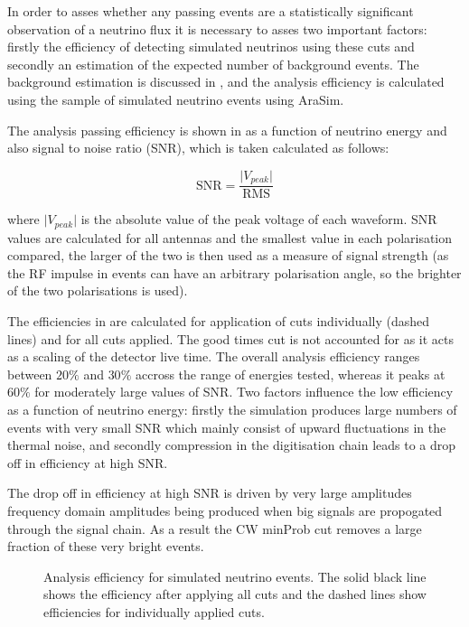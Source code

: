In order to asses whether any passing events are a statistically significant observation of a neutrino flux it is necessary to asses two important factors: firstly the efficiency of detecting simulated neutrinos using these cuts and secondly an estimation of the expected number of background events. The background estimation is discussed in , and the analysis efficiency is calculated using the sample of simulated neutrino events using AraSim.

The analysis passing efficiency is shown in  as a function of neutrino energy and also signal to noise ratio (SNR), which is taken calculated as follows:

\begin{equation}
  \mbox{SNR} = \frac{\lvert V_{peak} \rvert}{\mbox{RMS}}
\end{equation}

\noindent where $\lvert V_{peak} \rvert$ is the absolute value of the peak voltage of each waveform. SNR values are calculated for all antennas and the smallest value in each polarisation compared, the larger of the two is then used as a measure of signal strength (as the RF impulse in events can have an arbitrary polarisation angle, so the brighter of the two polarisations is used).

The efficiencies in  are calculated for application of cuts individually (dashed lines) and for all cuts applied. The good times cut is not accounted for as it acts as a scaling of the detector live time. The overall analysis efficiency ranges between $20 \%$ and $30 \%$ accross the range of energies tested, whereas it peaks at $60 \%$ for moderately large values of SNR. Two factors influence the low efficiency as a function of neutrino energy: firstly the simulation produces large numbers of events with very small SNR which mainly consist of upward fluctuations in the thermal noise, and secondly compression in the digitisation chain leads to a drop off in efficiency at high SNR. 

The drop off in efficiency at high SNR is driven by very large amplitudes frequency domain amplitudes being produced when big signals are propogated through the signal chain. As a result the CW minProb cut removes a large fraction of these very bright events. 


\begin{figure}[htpb]
\hfill
{}
\caption{Analysis efficiency for simulated neutrino events. The solid black line shows the efficiency after applying all cuts and the dashed lines show efficiencies for individually applied cuts.}
\label{fig:Analysis:Cut-Results:Efficiency}
\end{figure}


